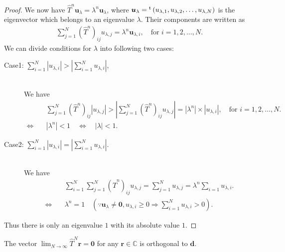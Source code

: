 \begin{proof}
	We now have $\hat{T}^{n}\bm{u}_{\lambda}=\lambda^{n}\bm{u}_{\lambda}$, where $\bm{u}_{\lambda} = {}^{\rm t}\left(u_{\lambda,1}, u_{\lambda,2}, \dots, u_{\lambda,N}\right)$ is the eigenvector which belongs to an eigenvalue $\lambda$. Their components are written as
	\begin{align}
	\sum_{j=1}^{N}\left(\hat{T}^{n}\right)_{ij}u_{\lambda,j} = \lambda^{n} \bm{u}_{\lambda,i},\quad\text{for $i = 1,2,\dots,N$}.
	\end{align}
	We can divide conditions for $\lambda$ into following two cases:
	\begin{description}
		\item[Case1: $\sum_{i=1}^{N}|u_{\lambda,i}| > |\sum_{i=1}^{N}u_{\lambda,i}|$,]\mbox{}\\
		We have
		\begin{align}
		&\sum_{j=1}^{N}\left(\hat{T}^{n}\right)_{ij}|u_{\lambda,j}| > |\sum_{j=1}^{N}\left(\hat{T}^{n}\right)_{ij}u_{\lambda,j}| = |\lambda^{n}|\times|u_{\lambda,i}|,\quad\text{for $i = 1,2,\dots,N$}.\\
		\Longleftrightarrow\quad & |\lambda^{n}| < 1 \quad \Longleftrightarrow\quad |\lambda| < 1.
		\end{align}
		\item[Case2: $\sum_{i=1}^{N}|u_{\lambda,i}| = |\sum_{i=1}^{N}u_{\lambda,i}|$.]\mbox{}\\
		We have
		\begin{align}
		& \sum_{i=1}^{N}\sum_{j=1}^{N}\left(\hat{T}^{n}\right)_{ij}u_{\lambda,j}  = \sum_{j=1}^{N}u_{\lambda,j}  = \lambda^{n}\sum_{i=1}u_{\lambda,i}.\\
		\Longleftrightarrow\quad & \lambda^{n} = 1\quad(\because \bm{u}_{\lambda}\neq\bm{0},u_{\lambda,i}\geq 0 \Rightarrow \sum_{i=1}^{N}u_{\lambda,i} > 0).
		\end{align}
	\end{description}
	Thus there is only an eigenvalue $1$ with its absolute value $1$.
\end{proof}

\begin{theorem}
	The vector $\lim_{N\to\infty}\hat{T}^{N}\bm{r} = \bm{0}$ for any $\bm{r}\in\mathbb{C}$ is orthogonal to $\bm{d}$.
\end{theorem}

